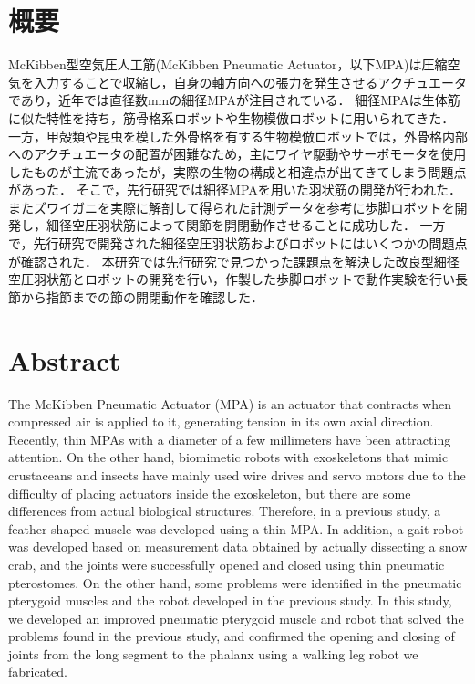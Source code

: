\newpage
\section*{概要}
McKibben型空気圧人工筋(McKibben Pneumatic Actuator，以下MPA)は圧縮空気を入力することで収縮し，自身の軸方向への張力を発生させるアクチュエータであり，近年では直径数mmの細径MPAが注目されている．
細径MPAは生体筋に似た特性を持ち，筋骨格系ロボットや生物模倣ロボットに用いられてきた．
一方，甲殻類や昆虫を模した外骨格を有する生物模倣ロボットでは，外骨格内部へのアクチュエータの配置が困難なため，主にワイヤ駆動やサーボモータを使用したものが主流であったが，実際の生物の構成と相違点が出てきてしまう問題点があった．
そこで，先行研究では細径MPAを用いた羽状筋の開発が行われた．またズワイガニを実際に解剖して得られた計測データを参考に歩脚ロボットを開発し，細径空圧羽状筋によって関節を開閉動作させることに成功した\cite{hasegawa}．
一方で，先行研究で開発された細径空圧羽状筋およびロボットにはいくつかの問題点が確認された．
本研究では先行研究で見つかった課題点を解決した改良型細径空圧羽状筋とロボットの開発を行い，作製した歩脚ロボットで動作実験を行い長節から指節までの節の開閉動作を確認した．
\newpage
\section*{Abstract}
The McKibben Pneumatic Actuator (MPA) is an actuator that contracts when compressed air is applied to it, generating tension in its own axial direction.
Recently, thin MPAs with a diameter of a few millimeters have been attracting attention.
On the other hand, biomimetic robots with exoskeletons that mimic crustaceans and insects have mainly used wire drives and servo motors due to the difficulty of placing actuators inside the exoskeleton, but there are some differences from actual biological structures.
Therefore, in a previous study, a feather-shaped muscle was developed using a thin MPA. In addition, a gait robot was developed based on measurement data obtained by actually dissecting a snow crab, and the joints were successfully opened and closed using thin pneumatic pterostomes.
On the other hand, some problems were identified in the pneumatic pterygoid muscles and the robot developed in the previous study.
In this study, we developed an improved pneumatic pterygoid muscle and robot that solved the problems found in the previous study, and confirmed the opening and closing of joints from the long segment to the phalanx using a walking leg robot we fabricated.